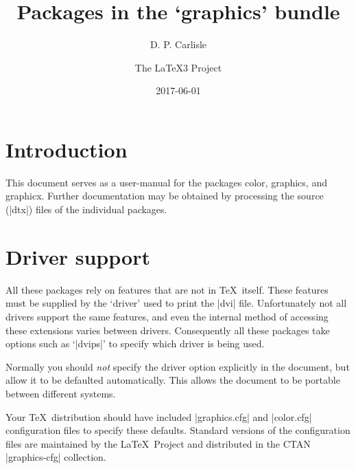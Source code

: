 

\renewcommand\star{{\ttfamily*}}

\let\package\textsf

\newlength{\gxlen}
\settowidth{\gxlen}{\package{graphicx}: }
\newcommand\gs{\makebox[\gxlen][l]{\package{graphics}:}}
\newcommand\gx{\makebox[\gxlen][l]{\package{graphicx}:}}

\MakeShortVerb{\|}


\title{Packages in the `graphics' bundle}
\author{D. P. Carlisle \and The \LaTeX3 Project}
\date{2017-06-01}

\maketitle

\tableofcontents

\section{Introduction}
This document serves as a user-manual for the packages \package{color},
\package{graphics}, and \package{graphicx}. Further documentation may be
obtained by processing the  source (|dtx|) files of the individual
packages.

\section{Driver support}\label{drivers}
All these packages rely on features that are not in \TeX\ itself.
These features must be supplied by the `driver' used to print the
|dvi| file. Unfortunately not all drivers support the same features, and
even the internal method of accessing these extensions varies between
drivers. Consequently all these packages take options such as
`|dvips|' to specify which driver is being used.

Normally you should \emph{not} specify the driver option explicitly
in the document, but allow it to be defaulted automatically.
This allows the document to be portable between different systems.

Your \TeX\ distribution should have included |graphics.cfg| and
|color.cfg| configuration files to specify these defaults.
Standard versions of the configuration files are maintained by the
\LaTeX\ Project and distributed in the CTAN |graphics-cfg| collection.

